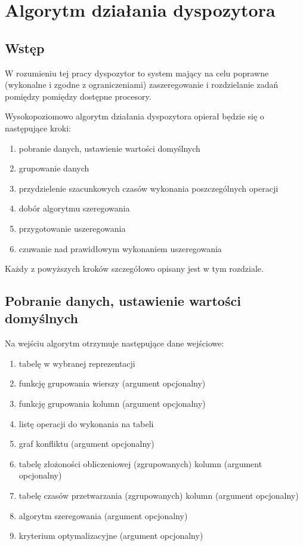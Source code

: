 \documentclass[brudnopis]{xmgr}
\begin{document}
\chapter{Algorytm działania dyspozytora}

\section{Wstęp}

W rozumieniu tej pracy dyspozytor to system mający na celu poprawne (wykonalne i zgodne z ograniczeniami) zaszeregowanie i rozdzielanie zadań pomiędzy pomiędzy dostępne procesory.

Wysokopoziomowo algorytm działania dyspozytora opierał będzie się o następujące kroki:

\begin{enumerate}
    \item pobranie danych, ustawienie wartości domyślnych
    \item grupowanie danych
    \item przydzielenie szacunkowych czasów wykonania poszczególnych operacji
    \item dobór algorytmu szeregowania 
    \item przygotowanie uszeregowania
    \item czuwanie nad prawidłowym wykonaniem uszeregowania
\end{enumerate}

Każdy z powyższych kroków szczegółowo opisany jest w tym rozdziale.

\newpage
\section{Pobranie danych, ustawienie wartości domyślnych}

Na wejściu algorytm otrzymuje następujące dane wejściowe:

\begin{enumerate}
    \item tabelę w wybranej reprezentacji
    \item funkcję grupowania wierszy (argument opcjonalny)
    \item funkcję grupowania kolumn (argument opcjonalny)
    \item listę operacji do wykonania na tabeli
    \item graf konfliktu (argument opcjonalny)
    \item tabelę złożoności obliczeniowej (zgrupowanych) kolumn (argument opcjonalny)
    \item tabelę czasów przetwarzania (zgrupowanych) kolumn (argument opcjonalny)
    \item algorytm szeregowania (argument opcjonalny)
    \item kryterium optymalizacyjne (argument opcjonalny)
\end{enumerate}
\end{document}
